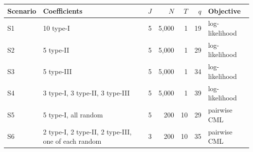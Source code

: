 \begin{tabular}{llrrrrl}
\toprule
Scenario & Coefficients & $J$ & $N$ & $T$ & $q$ & Objective \\
\midrule
S1 & 10 type-I & 5 & 5,000 & 1 & 19 & log-likelihood \\
S2 & 5 type-II & 5 & 5,000 & 1 & 29 & log-likelihood \\
S3 & 5 type-III & 5 & 5,000 & 1 & 34 & log-likelihood \\
S4 & 3 type-I, 3 type-II, 3 type-III & 5 & 5,000 & 1 & 39 & log-likelihood \\
S5 & 5 type-I, all random & 5 & 200 & 10 & 29 & pairwise CML \\
S6 & 2 type-I, 2 type-II, 2 type-III, one of each random & 3 & 200 & 10 & 35 & pairwise CML \\
\bottomrule
\end{tabular}
